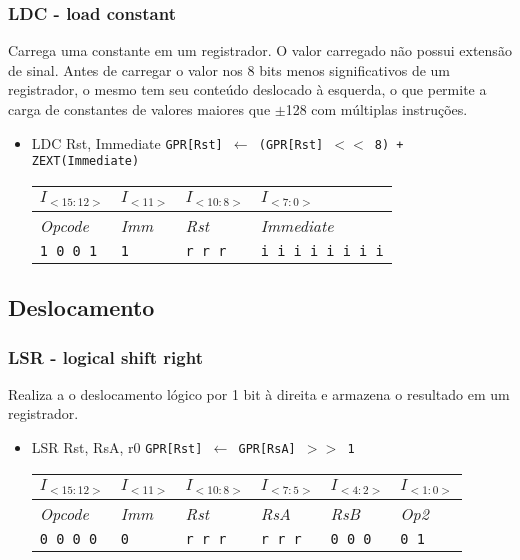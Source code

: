 \documentclass{extreport}
\begin{document}
\subsubsection{LDC - load constant}
Carrega uma constante em um registrador. O valor carregado não possui extensão de sinal. Antes de carregar o valor nos 8 bits menos significativos de um registrador, o mesmo tem seu conteúdo deslocado à esquerda, o que permite a carga de constantes de valores maiores que $\pm$128 com múltiplas instruções.

\begin{itemize}
\item LDC Rst, Immediate
\subitem \texttt{GPR[Rst] $\leftarrow$ (GPR[Rst] $<<$ 8) + ZEXT(Immediate)}
\begin{table}[ht!]
\centering
\begin{tabular}{|p{1.6cm}|p{1.6cm}|p{1.6cm}|p{5.65cm}|}
\hline
$I_{<15:12>}$ & $I_{<11>}$ & $I_{<10:8>}$ & $I_{<7:0>}$ \\ \hline
\textit{Opcode} & \textit{Imm} & \textit{Rst} & \textit{Immediate} \\ \hline
\texttt{1 0 0 1} & \texttt{1} & \texttt{r r r} & \texttt{i i i i i i i i} \\ \hline
\end{tabular}
\end{table}
\end{itemize}

\subsection{Deslocamento}
\subsubsection{LSR - logical shift right}
Realiza a o deslocamento lógico por 1 bit à direita e armazena o resultado em um registrador.

\begin{itemize}
\item LSR Rst, RsA, r0
\subitem \texttt{GPR[Rst] $\leftarrow$ GPR[RsA] $>>$ 1}
\begin{table}[ht!]
\centering
\begin{tabular}{|p{1.6cm}|p{1.6cm}|p{1.6cm}|p{1.6cm}|p{1.6cm}|p{1.6cm}|}
\hline
$I_{<15:12>}$ & $I_{<11>}$ & $I_{<10:8>}$ & $I_{<7:5>}$ & $I_{<4:2>}$ & $I_{<1:0>}$ \\ \hline
\textit{Opcode} & \textit{Imm} & \textit{Rst} & \textit{RsA} & \textit{RsB} & \textit{Op2} \\ \hline
\texttt{0 0 0 0} & \texttt{0} & \texttt{r r r} & \texttt{r r r} & \texttt{0 0 0} & \texttt{0 1} \\ \hline
\end{tabular}
\end{table}
\end{itemize}
\end{document}
